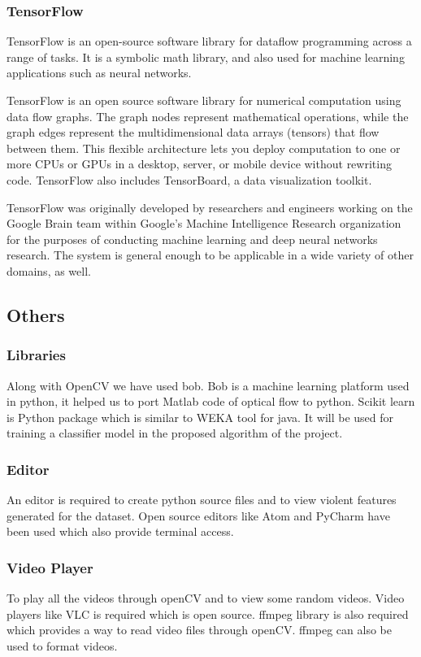 \subsubsection{TensorFlow}
TensorFlow\cite{tensorflow} is an open-source software library for dataflow programming across a range of tasks. It is a symbolic math library, and also used for machine learning applications such as neural networks.
\par
TensorFlow is an open source software library for numerical computation using data flow graphs. The graph nodes represent mathematical operations, while the graph edges represent the multidimensional data arrays (tensors) that flow between them. This flexible architecture lets you deploy computation to one or more CPUs or GPUs in a desktop, server, or mobile device without rewriting code. TensorFlow also includes TensorBoard, a data visualization toolkit.
\par
TensorFlow was originally developed by researchers and engineers working on the Google Brain team within Google's Machine Intelligence Research organization for the purposes of conducting machine learning and deep neural networks research. The system is general enough to be applicable in a wide variety of other domains, as well.
\subsection{Others}
\subsubsection{Libraries}
Along with OpenCV we have used bob. Bob\cite{bob} is a machine learning platform used in python, it helped us to port Matlab code of optical flow to python. Scikit learn is Python package which is similar to WEKA tool for java. It will be used for training a classifier model in the proposed algorithm of the project.

\subsubsection{Editor}
An editor is required to create python source files and to view violent features generated for the dataset. Open source editors like Atom and PyCharm have been used which also provide terminal access.

\subsubsection{Video Player}
To play all the videos through openCV and to view some random videos. Video players like VLC is required which is open source. ffmpeg library is also required which provides a way to read video files through openCV. ffmpeg can also be used to format videos.


